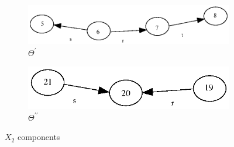 \documentclass[a4paper,12pt]{article}
\numberwithin{equation}{section}
\numberwithin{figure}{section}
\begin{document}
\begin{figure}
\begin{center}
\begin{subfigure}[b]{.3\columnwidth}
\includegraphics[scale=0.5, bb=0 0  82 280]{ex_K_Y1.eps}
\caption{$\Theta^\prime$}
\label{fig:KY1}
\end{subfigure}
\hspace*{2cm}
\begin{subfigure}[b]{.3\columnwidth}
\includegraphics[scale=0.5, bb=0 0 82 210]{ex_K_Y2.eps}
\caption{$\Theta^{\prime\prime}$}
\label{fig:KY2}
\end{subfigure}
\end{center}
\caption{$X_2$ components}
\label{fig:KY}
\end{figure}
\end{document}
